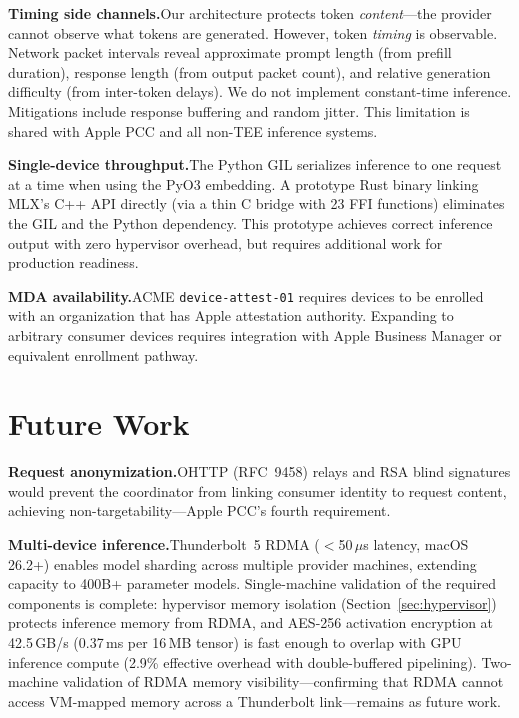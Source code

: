 \documentclass[10pt,twocolumn,letterpaper]{article}
\begin{document}
\textbf{Timing side channels.}\quad Our architecture protects token \emph{content}---the provider cannot observe what tokens are generated. However, token \emph{timing} is observable. Network packet intervals reveal approximate prompt length (from prefill duration), response length (from output packet count), and relative generation difficulty (from inter-token delays). We do not implement constant-time inference. Mitigations include response buffering and random jitter. This limitation is shared with Apple PCC and all non-TEE inference systems.

\textbf{Single-device throughput.}\quad The Python GIL serializes inference to one request at a time when using the PyO3 embedding. A prototype Rust binary linking MLX's C++ API directly (via a thin C bridge with 23 FFI functions) eliminates the GIL and the Python dependency. This prototype achieves correct inference output with zero hypervisor overhead, but requires additional work for production readiness.

\textbf{MDA availability.}\quad ACME \texttt{device-attest-01} requires devices to be enrolled with an organization that has Apple attestation authority. Expanding to arbitrary consumer devices requires integration with Apple Business Manager or equivalent enrollment pathway.

\section{Future Work}
\label{sec:future}

\textbf{Request anonymization.}\quad OHTTP (RFC~9458) relays and RSA blind signatures would prevent the coordinator from linking consumer identity to request content, achieving non-targetability---Apple PCC's fourth requirement.

\textbf{Multi-device inference.}\quad Thunderbolt~5 RDMA ($<$50\,$\mu$s latency, macOS 26.2+) enables model sharding across multiple provider machines, extending capacity to 400B+ parameter models. Single-machine validation of the required components is complete: hypervisor memory isolation (Section~\ref{sec:hypervisor}) protects inference memory from RDMA, and AES-256 activation encryption at 42.5\,GB/s (0.37\,ms per 16\,MB tensor) is fast enough to overlap with GPU inference compute (2.9\% effective overhead with double-buffered pipelining). Two-machine validation of RDMA memory visibility---confirming that RDMA cannot access VM-mapped memory across a Thunderbolt link---remains as future work.
\end{document}
